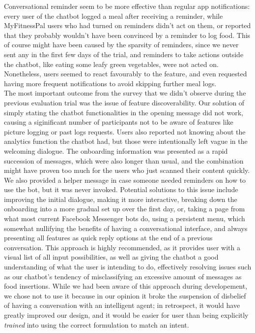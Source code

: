 Conversational reminder seem to be more effective than regular app notifications: every user of the chatbot logged a meal after receiving a reminder, while MyFitnessPal users who had turned on reminders didn't act on them, or reported that they probably wouldn't have been convinced by a reminder to log food. This of course might have been caused by the sparsity of reminders, since we never sent any in the first few days of the trial, and reminders to take actions outside the chatbot, like eating some leafy green vegetables, were not acted on. Nonetheless, users seemed to react favourably to the feature, and even requested having more frequent notifications to avoid skipping further meal logs. \\
The most important outcome from the survey that we didn't observe during the previous evaluation trial was the issue of feature discoverability. Our solution of simply stating the chatbot functionalities in the opening message did not work, causing a siginificant number of participants not to be aware of features like picture logging or past logs requests. Users also reported not knowing about the analytics function the chatbot had, but those were intentionally left vague in the welcoming dialogue. The onboarding information was presented as a rapid succession of messages, which were also longer than usual, and the combination might have proven too much for the users who just scanned their content quickly. We also provided a helper message in case someone needed reminders on how to use the bot, but it was never invoked. Potential solutions to this issue include improving the initial dialogue, making it more interactive, breaking down the onboarding into a more gradual set up over the first day, or, taking a page from what most current Facebook Messenger bots do, using a persistent menu, which somewhat nullifying the benefits of having a conversational interface, and always presenting all features as quick reply options at the end of a previous conversation. This approach is highly recommended, as it provides user with a visual list of all input possibilities, as well as giving the chatbot a good understanding of what the user is intending to do, effectively resolving issues such as our chatbot's tendency of misclassifying an excessive amount of messages as food insertions. While we had been aware of this approach during developement, we chose not to use it because in our opinion it broke the suspension of disbelief of having a conversation with an intelligent agent; in retrospect, it would have greatly improved our design, and it would be easier for user than being explicitly \textit{trained} into using the correct formulation to match an intent. \\
